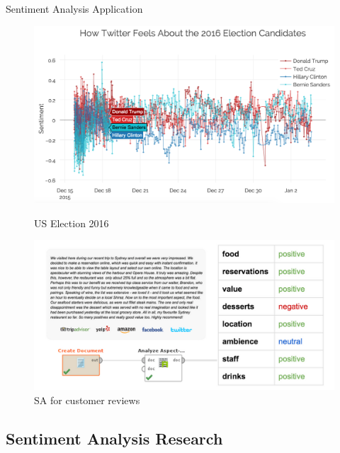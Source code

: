 \documentclass[xcolor=table]{beamer}
\begin{document}
\begin{frame}{Sentiment Analysis Application}

    \begin{figure}[ht]
        \begin{minipage}[b]{0.45\linewidth}
            \centering
            \includegraphics[width=\textwidth]{img/SA-election.png}
            \caption{US Election 2016}
            \label{fig:a}
        \end{minipage}
        \hspace{0.5cm}
        \begin{minipage}[b]{0.45\linewidth}
            \centering
            \includegraphics[width=\textwidth]{img/SA-aspect.png}
            \caption{SA for customer reviews}
            \label{fig:b}
        \end{minipage}
    \end{figure}

\end{frame}




\subsection{Sentiment Analysis Research}
\end{document}

